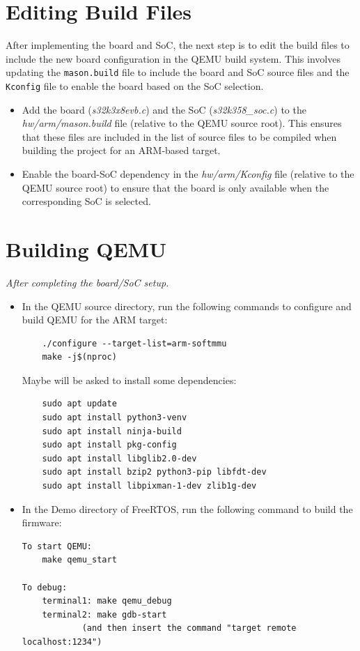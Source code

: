 \section{Editing Build Files}
After implementing the board and SoC, the next step is to edit the build files to include the new board configuration in the QEMU build system. This involves updating the \texttt{mason.build} file to include the board and SoC source files and the \texttt{Kconfig} file to enable the board based on the SoC selection.

\begin{itemize}
    \item Add the board (\textit{s32k3x8evb.c}) and the SoC (\textit{s32k358\_soc.c}) to the \textit{hw/arm/mason.build} file (relative to the QEMU source root). This ensures that these files are included in the list of source files to be compiled when building the project for an ARM-based target.
    \item Enable the board-SoC dependency in the \textit{hw/arm/Kconfig} file (relative to the QEMU source root) to ensure that the board is only available when the corresponding SoC is selected.
\end{itemize}

\section{Building QEMU}
\begin{center}
    \textit{After completing the board/SoC setup.}
\end{center}
\begin{itemize}
    \item In the QEMU source directory, run the following commands to configure and build QEMU for the ARM target:    
    \begin{verbatim}
    ./configure --target-list=arm-softmmu
    make -j$(nproc)
        \end{verbatim}
            Maybe will be asked to install some dependencies:
    \begin{verbatim}
    sudo apt update
    sudo apt install python3-venv
    sudo apt install ninja-build
    sudo apt install pkg-config
    sudo apt install libglib2.0-dev
    sudo apt install bzip2 python3-pip libfdt-dev
    sudo apt install libpixman-1-dev zlib1g-dev
    \end{verbatim}

    \item In the Demo directory of FreeRTOS, run the following command to build the firmware:
\begin{verbatim}
To start QEMU:
    make qemu_start

To debug:
    terminal1: make qemu_debug
    terminal2: make gdb-start 
            (and then insert the command "target remote localhost:1234")
\end{verbatim}
\end{itemize}


